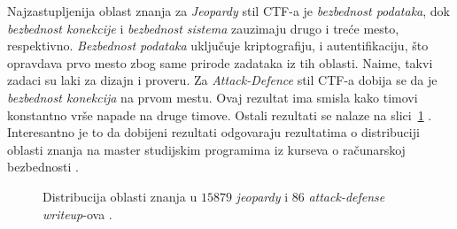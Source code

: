 \documentclass[12pt, a4paper, twocolumn]{article}
\begin{document}
Najzastupljenija oblast znanja za \emph{Jeopardy} stil CTF-a je 
\emph{bezbednost podataka}, dok \emph{bezbednost konekcije} i 
\emph{bezbednost sistema} zauzimaju drugo i treće mesto, respektivno. 
\emph{Bezbednost podataka} uključuje kriptografiju, i autentifikaciju, 
što opravdava prvo mesto zbog same prirode zadataka iz tih oblasti. Naime,
takvi zadaci su laki za dizajn i proveru. Za \emph{Attack-Defence} stil CTF-a
dobija se da je \emph{bezbednost konekcija} na prvom mestu. Ovaj rezultat ima
smisla kako timovi konstantno vrše napade na druge timove. Ostali rezultati 
se nalaze na slici~\ref{fig:ctf_ka} \cite{ctf_skills}. Interesantno je to da
dobijeni rezultati odgovaraju rezultatima o distribuciji oblasti znanja na 
master studijskim programima iz kurseva o računarskoj 
bezbednosti \cite{oth_ka, ctf_skills}.

\begin{figure}
    \begin{center}
    \end{center}
    \caption{
        Distribucija oblasti znanja u $15 879$ \emph{jeopardy} i 
        $86$ \emph{attack-defense} \emph{writeup}-ova \cite{ctf_skills}.
    }\label{fig:ctf_ka}
\end{figure}
\end{document}
